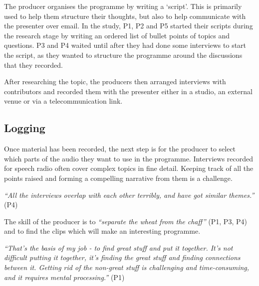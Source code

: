 The producer organises the programme by writing a `script'. This is
primarily used to help them structure their thoughts, but also to help
communicate with the presenter over email.
In the study, P1, P2 and P5 started their scripts
during the research stage by writing an ordered list of bullet points of topics
and questions.
P3 and P4 waited
until after they had done some interviews to start the script, as they wanted
to structure the programme around the discussions that they recorded.


After researching the topic, the producers then arranged interviews with
contributors and recorded them with the presenter either in a studio, an external
venue or via a telecommunication link.

\subsection{Logging}
Once material has been recorded, the next step is for the producer to select
which parts of the audio they want to use in the programme.
Interviews recorded for speech radio often cover complex topics in fine
detail. Keeping track of all the points raised and forming a compelling
narrative from them is a challenge.

\textit{``All the interviews overlap with each other terribly, and have got
  similar themes.''} (P4)

The skill of the producer is to \textit{``separate the wheat from the chaff''}
(P1, P3, P4) and to find the clips which will make an interesting programme.

\textit{``That's the basis of my job - to find great stuff and put it together.
  It's not difficult putting it together, it's finding the great stuff and
  finding connections between it. Getting rid of the non-great stuff is
  challenging and time-consuming, and it requires mental processing.''} (P1)

